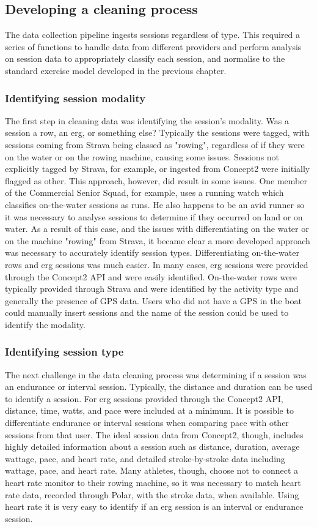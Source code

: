 \subsection{Developing a cleaning process}
The data collection pipeline ingests sessions regardless of type. This required a series of functions to handle data from different providers and perform analysis on session data to appropriately classify each session, and normalise to the standard exercise model developed in the previous chapter.

\subsubsection{Identifying session modality}
The first step in cleaning data was identifying the session's modality. Was a session a row, an erg, or something else? Typically the sessions were tagged, with sessions coming from Strava being classed as "rowing", regardless of if they were on the water or on the rowing machine, causing some issues. Sessions not explicitly tagged by Strava, for example, or ingested from Concept2 were initially flagged as other. This approach, however, did result in some issues. One member of the Commercial Senior Squad, for example, uses a running watch which classifies on-the-water sessions as runs. He also happens to be an avid runner so it was necessary to analyse sessions to determine if they occurred on land or on water. As a result of this case, and the issues with differentiating on the water or on the machine "rowing" from Strava, it became clear a more developed approach was necessary to accurately identify session types. Differentiating on-the-water rows and erg sessions was much easier. In many cases, erg sessions were provided through the Concept2 API and were easily identified. On-the-water rows were typically provided through Strava and were identified by the activity type and generally the presence of GPS data. Users who did not have a GPS in the boat could manually insert sessions and the name of the session could be used to identify the modality.


\subsubsection{Identifying session type}
The next challenge in the data cleaning process was determining if a session was an endurance or interval session. Typically, the distance and duration can be used to identify a session. For erg sessions provided through the Concept2 API, distance, time, watts, and pace were included at a minimum. It is possible to differentiate endurance or interval sessions when comparing pace with other sessions from that user. The ideal session data from Concept2, though, includes highly detailed information about a session such as distance, duration, average wattage, pace, and heart rate, and detailed stroke-by-stroke data including wattage, pace, and heart rate. Many athletes, though, choose not to connect a heart rate monitor to their rowing machine, so it was necessary to match heart rate data, recorded through Polar, with the stroke data, when available. Using heart rate it is very easy to identify if an erg session is an interval or endurance session.

